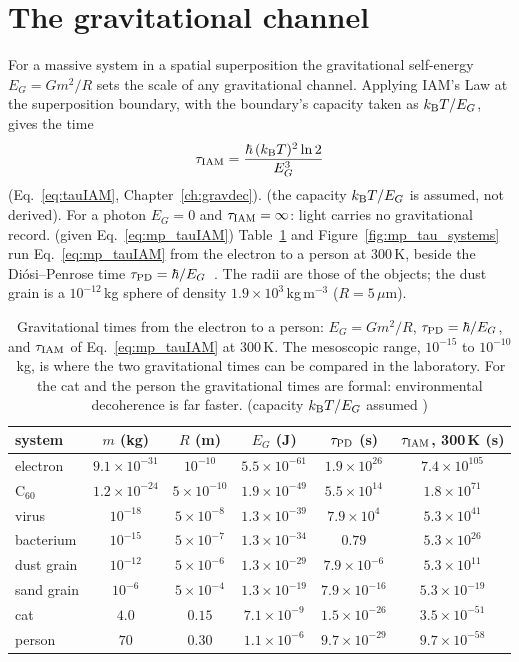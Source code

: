 \section{The gravitational channel}\label{sec:mp_gravity}
For a massive system in a spatial superposition the gravitational self-energy $E_G=Gm^2/R$ sets the scale of any gravitational channel. Applying IAM's
Law at the superposition boundary, with the boundary's capacity taken as $k_{\mathrm B} T/E_G$, gives the time
\begin{equation}
\tau_{\rm IAM}=\frac{\hbar\,(k_{\mathrm B} T)^2\ln2}{E_G^3}\label{eq:mp_tauIAM}
\end{equation}
(Eq.~\ref{eq:tauIAM}, Chapter~\ref{ch:gravdec}). \conjecture{} (the capacity $k_{\mathrm B} T/E_G$ is assumed, not derived). For a photon $E_G=0$ and
$\tau_{\rm IAM}=\infty$: light carries no gravitational record. \derived{} (given Eq.~\ref{eq:mp_tauIAM}) Table~\ref{tab:mp_systems} and
Figure~\ref{fig:mp_tau_systems} run Eq.~\eqref{eq:mp_tauIAM} from the electron to a person at 300\,K, beside the Di\'osi--Penrose time
$\tau_{\rm PD}=\hbar/E_G$~\cite{Diosi1987,Penrose1996}. The radii are those of the objects; the dust grain is a $10^{-12}$\,kg sphere of density
$1.9\times10^3$\,kg\,m$^{-3}$ ($R=5\,\mu$m).

\begin{table}[htbp]\centering\small
\caption{Gravitational times from the electron to a person: $E_G=Gm^2/R$, $\tau_{\rm PD}=\hbar/E_G$, and $\tau_{\rm IAM}$ of Eq.~\eqref{eq:mp_tauIAM} at
300\,K. The mesoscopic range, $10^{-15}$ to $10^{-10}$\,kg, is where the two gravitational times can be compared in the laboratory. For the cat and the
person the gravitational times are formal: environmental decoherence is far faster. \calc{} (capacity $k_{\mathrm B} T/E_G$ assumed \conjecture)}\label{tab:mp_systems}
\begin{tabular}{@{}lccccc@{}}\toprule
system & $m$ (kg) & $R$ (m) & $E_G$ (J) & $\tau_{\rm PD}$ (s) & $\tau_{\rm IAM}$, 300\,K (s)\\\midrule
electron & $9.1\times10^{-31}$ & $10^{-10}$ & $5.5\times10^{-61}$ & $1.9\times10^{26}$ & $7.4\times10^{105}$\\
C$_{60}$ & $1.2\times10^{-24}$ & $5\times10^{-10}$ & $1.9\times10^{-49}$ & $5.5\times10^{14}$ & $1.8\times10^{71}$\\
virus & $10^{-18}$ & $5\times10^{-8}$ & $1.3\times10^{-39}$ & $7.9\times10^{4}$ & $5.3\times10^{41}$\\
bacterium & $10^{-15}$ & $5\times10^{-7}$ & $1.3\times10^{-34}$ & $0.79$ & $5.3\times10^{26}$\\
dust grain & $10^{-12}$ & $5\times10^{-6}$ & $1.3\times10^{-29}$ & $7.9\times10^{-6}$ & $5.3\times10^{11}$\\
sand grain & $10^{-6}$ & $5\times10^{-4}$ & $1.3\times10^{-19}$ & $7.9\times10^{-16}$ & $5.3\times10^{-19}$\\
cat & $4.0$ & $0.15$ & $7.1\times10^{-9}$ & $1.5\times10^{-26}$ & $3.5\times10^{-51}$\\
person & $70$ & $0.30$ & $1.1\times10^{-6}$ & $9.7\times10^{-29}$ & $9.7\times10^{-58}$\\\bottomrule
\end{tabular}
\end{table}


